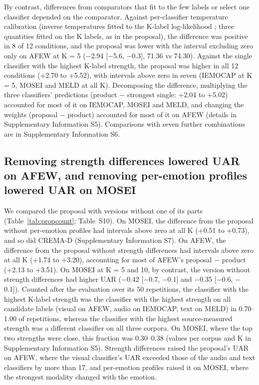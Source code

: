 By contrast, differences from comparators that fit to the few labels or select one classifier depended on the comparator. Against per-classifier temperature calibration (inverse temperatures fitted to the K-label log-likelihood \cite{guo2017calibration}; three quantities fitted on the K labels, as in the proposal), the difference was positive in 8 of 12 conditions, and the proposal was lower with the interval excluding zero only on AFEW at K = 5 ($-$2.94 [$-$5.6, $-$0.3], 71.36 vs 74.30). Against the single classifier with the highest K-label strength, the proposal was higher in all 12 conditions (+2.70 to +5.52\pt), with intervals above zero in seven (IEMOCAP at K = 5, MOSEI and MELD at all K). Decomposing the difference, multiplying the three classifiers' predictions (product $-$ strongest single: +2.04 to +5.02\pt) accounted for most of it on IEMOCAP, MOSEI and MELD, and changing the weights (proposal $-$ product) accounted for most of it on AFEW (details in Supplementary Information S5). Comparisons with seven further combinations are in Supplementary Information S6.

\subsection{Removing strength differences lowered UAR on AFEW, and removing per-emotion profiles lowered UAR on MOSEI}\label{sec:res-ablation}
We compared the proposal with versions without one of its parts (Table~\ref{tab:propcount}; Table~S10). On MOSEI, the difference from the proposal without per-emotion profiles had intervals above zero at all K (+0.51 to +0.73\pt), and so did CREMA-D (Supplementary Information S7). On AFEW, the difference from the proposal without strength differences had intervals above zero at all K (+1.74 to +3.20\pt), accounting for most of AFEW's proposal $-$ product (+2.13 to +3.51\pt). On MOSEI at K = 5 and 10, by contrast, the version without strength differences had higher UAR ($-$0.42 [$-$0.7, $-$0.1] and $-$0.35 [$-$0.6, $-$0.1]\pt). Counted after the evaluation over its 50 repetitions, the classifier with the highest K-label strength was the classifier with the highest strength on all candidate labels (visual on AFEW, audio on IEMOCAP, text on MELD) in 0.70--1.00 of repetitions, whereas the classifier with the highest source-measured strength was a different classifier on all three corpora. On MOSEI, where the top two strengths were close, this fraction was 0.30--0.38 (values per corpus and K in Supplementary Information S5). Strength differences raised the proposal's UAR on AFEW, where the visual classifier's UAR exceeded those of the audio and text classifiers by more than 17\pt, and per-emotion profiles raised it on MOSEI, where the strongest modality changed with the emotion.

